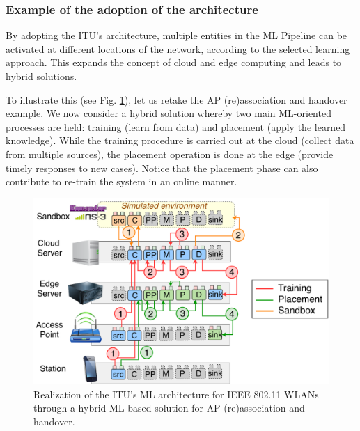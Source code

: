 \documentclass[journal]{IEEEtran}
\begin{document}

\subsubsection{Example of the adoption of the architecture}
By adopting the ITU's architecture, multiple entities in the ML Pipeline can be activated at different locations of the network, according to the selected learning approach. This expands the concept of cloud and edge computing and leads to hybrid solutions.%

To illustrate this (see Fig. \ref{fig:ml_architecture_wlan}), let us retake the AP (re)association and handover example. We now consider a hybrid solution whereby two main ML-oriented processes are held: training (learn from data) and placement (apply the learned knowledge). While the training procedure is carried out at the cloud (collect data from multiple sources), the placement operation is done at the edge (provide timely responses to new cases). Notice that the placement phase can also contribute to re-train the system in an online manner. %

\begin{figure}[ht!]
	\includegraphics[width=1\columnwidth]{ml_architecture_wlan_2}
	\caption{Realization of the ITU's ML architecture for IEEE 802.11 WLANs through a hybrid ML-based solution for AP (re)association and handover.}
	\label{fig:ml_architecture_wlan}
\end{figure}
\end{document}

